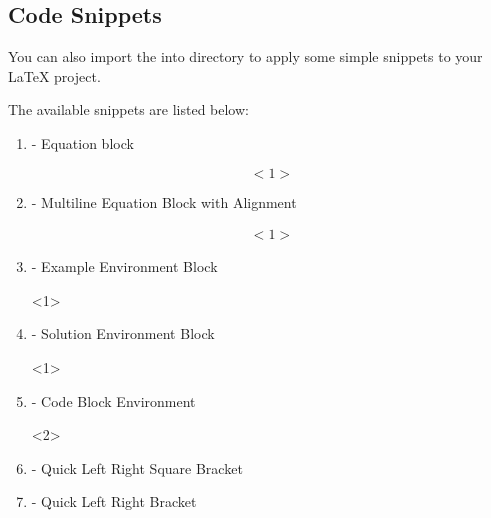 \documentclass{article}
\begin{document}
\subsection{Code Snippets}

You can also import the  into  directory to apply some simple snippets to your LaTeX project.

The available snippets are listed below:

\begin{enumerate}
    \item {} - Equation block
        \begin{codeblock}[tex]
\begin{equation*}
    <1>
\end{equation*}
        \end{codeblock}
    \item {} - Multiline Equation Block with Alignment
\begin{codeblock}[tex]
\begin{equation*}
    \begin{aligned}
        <1>
    \end{aligned}
\end{equation*}
\end{codeblock}
    \item {} - Example Environment Block
\begin{codeblock}[tex]
\begin{example}
    <1>
\end{example}
\end{codeblock}
    \item {} - Solution Environment Block
\begin{codeblock}[tex]
\begin{solution}
    <1>
\end{solution}
\end{codeblock}
    \item {} - Code Block Environment
\begin{codeblock}[tex]
\begin {codeblock}[<1>]
<2>
\end {codeblock}
\end{codeblock}
    \item {} - Quick Left Right Square Bracket
\begin{codeblock}[tex]
\left [ <1> \right ]
\end{codeblock}
    \item {} - Quick Left Right Bracket

\end{enumerate}
\end{document}

